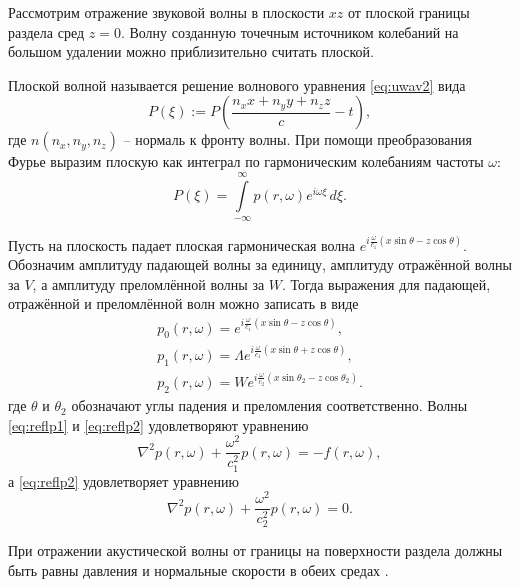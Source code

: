 \documentclass[a4paper, fontsize=14pt]{article}
\begin{document}
	Рассмотрим отражение звуковой волны в плоскости $xz$ от плоской границы раздела сред $z=0$. Волну созданную точечным источником колебаний на большом удалении можно приблизительно считать плоской. 

	Плоской волной называется решение волнового уравнения \eqref{eq:uwav2} вида $$P(\xi) := P\left(\frac{n_xx+n_yy+n_zz}{c}-t\right),$$ где $n(n_x,n_y,n_z)$ -- нормаль к фронту волны.
	При помощи преобразования Фурье выразим плоскую как интеграл по гармоническим колебаниям частоты $\omega$:
	\begin{equation}
		P(\xi) = \int \limits_{-\infty}^{\infty} p(r,\omega) e^{i\omega \xi}\, d\xi.
	\end{equation}

	Пусть на плоскость падает плоская гармоническая волна $e^{i\frac{\omega}{c_1}(x\sin \theta - z\cos \theta)}$.
	Обозначим амплитуду падающей волны за единицу, амплитуду отражённой волны за $V$, а амплитуду преломлённой волны за $W$.
	Тогда выражения для падающей, отражённой и преломлённой волн можно записать в виде \cite{brehovskih} 
	\begin{gather}
		p_0(r,\omega) = e^{i\frac{\omega}{c_1}(x\sin \theta - z\cos \theta)},\label{eq:reflp0}\\ 
		p_1(r,\omega) = \Lambda e^{i\frac{\omega}{c_1}(x\sin \theta + z\cos \theta)},\label{eq:reflp1}\\
		p_2(r,\omega) = W e^{i\frac{\omega}{c_2}(x\sin \theta_2 - z\cos \theta_2)}\label{eq:reflp2}.
	\end{gather}
	где $\theta$ и $\theta_2$ обозначают углы падения и преломления соответственно. Волны \eqref{eq:reflp1} и \eqref{eq:reflp2} удовлетворяют уравнению 
	\begin{equation}
		\nabla^2 p(r,\omega) + \frac{\omega^2}{c_1^2}p(r,\omega) = - f(r,\omega),
	\end{equation}
	а  \eqref{eq:reflp2} удовлетворяет уравнению
	\begin{equation}
		\nabla^2 p(r,\omega) + \frac{\omega^2}{c_2^2}p(r,\omega) = 0.
	\end{equation}
	
	При отражении акустической волны от границы на поверхности раздела должны быть равны давления и нормальные скорости в обеих средах \cite{landavshic}.
	
\end{document}
